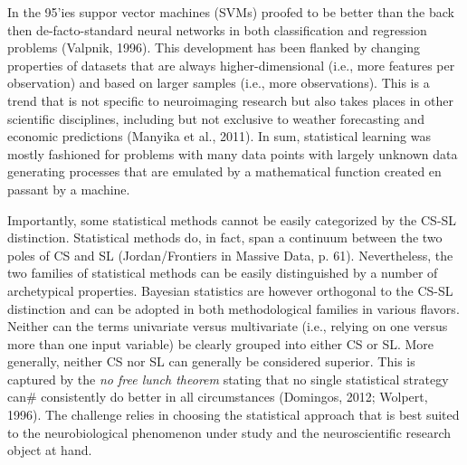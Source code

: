 \documentclass[authoryear,review,3p]{elsarticle}
\begin{document}
In the 95'ies suppor vector machines (SVMs)
proofed to be better than the back then de-facto-standard neural networks
in both classification and regression problems (Valpnik, 1996).
This development has been flanked by changing properties of datasets that
are always higher-dimensional (i.e., more features per observation)
and
based
on larger samples (i.e., more observations).
This is a trend that is not specific to
neuroimaging research but also takes places
in other scientific disciplines,
including but not exclusive to weather forecasting and economic predictions
(Manyika et al., 2011).
In sum,
statistical learning was mostly fashioned
for problems with many data points with largely unknown
data generating processes
that are emulated by a mathematical function
created en passant by a machine.


Importantly, some statistical
methods cannot be easily categorized by the CS-SL distinction.
Statistical methods do, in fact, span a continuum between the two poles of CS and SL
(Jordan/Frontiers in Massive Data, p. 61).
Nevertheless, the two families of statistical methods
can be easily distinguished by a number of archetypical properties.
Bayesian statistics are however orthogonal to the CS-SL distinction
and can be adopted in both methodological families in various flavors.
%
Neither can the terms univariate versus multivariate
(i.e., relying on one versus more than one input variable)
be clearly grouped into either CS or SL.
%
More generally,
neither CS nor SL can generally be considered superior.
This is captured by the \textit{no free lunch theorem}
stating that no single statistical strategy can#
consistently do better in all circumstances (Domingos, 2012; Wolpert, 1996).
The challenge relies in choosing
the statistical approach that is best suited
to the neurobiological phenomenon under study and the neuroscientific research object at hand.
\end{document}
